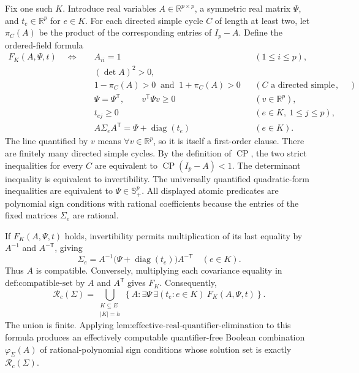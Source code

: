 Fix one such \(K\).  Introduce real variables \(A\in\mathbb R^{p\times p}\), a symmetric real matrix \(\Psi\), and \(t_e\in\mathbb R^p\) for \(e\in K\).  For each directed simple cycle \(C\) of length at least two, let \(\pi_C(A)\) be the product of the corresponding entries of \(I_p-A\).  Define the ordered-field formula
\[
\begin{aligned}
 F_K(A,\Psi,t)\quad\Longleftrightarrow\quad
 &A_{ii}=1 &&(1\leq i\leq p),\\
 &(\det A)^2>0,\\
 &1-\pi_C(A)>0\ \text{ and }\ 1+\pi_C(A)>0
   &&(C\text{ a directed simple cycle}),\\
 &\Psi=\Psi^{\mathsf T},\qquad
   v^{\mathsf T}\Psi v\geq0 &&(v\in\mathbb R^p),\\
 &t_{ej}\geq0 &&(e\in K,\ 1\leq j\leq p),\\
 &A\Sigma_eA^{\mathsf T}=\Psi+\operatorname{diag}(t_e)
   &&(e\in K).
\end{aligned}
\]
The line quantified by \(v\) means \(\forall v\in\mathbb R^p\), so it is itself a first-order clause.  There are finitely many directed simple cycles.  By the definition of \(\operatorname{CP}\), the two strict inequalities for every \(C\) are equivalent to \(\operatorname{CP}(I_p-A)<1\).  The determinant inequality is equivalent to invertibility.  The universally quantified quadratic-form inequalities are equivalent to \(\Psi\in\mathbb S_+^p\).  All displayed atomic predicates are polynomial sign conditions with rational coefficients because the entries of the fixed matrices \(\Sigma_e\) are rational.

If \(F_K(A,\Psi,t)\) holds, invertibility permits multiplication of its last equality by \(A^{-1}\) and \(A^{-\mathsf T}\), giving
\[
 \Sigma_e=A^{-1}\bigl(\Psi+\operatorname{diag}(t_e)\bigr)A^{-\mathsf T}
 \quad(e\in K).
\]
Thus \(A\) is compatible.  Conversely, multiplying each covariance equality in \(\text{def:compatible-set}\) by \(A\) and \(A^{\mathsf T}\) gives \(F_K\).  Consequently,
\[
 \mathcal R_c(\Sigma)
 =\bigcup_{\substack{K\subseteq E\\ |K|=h}}
   \left\{A:\exists\Psi\,\exists(t_e:e\in K)\ F_K(A,\Psi,t)\right\}.
\]
The union is finite.  Applying \(\text{lem:effective-real-quantifier-elimination}\) to this formula produces an effectively computable quantifier-free Boolean combination \(\varphi_\Sigma(A)\) of rational-polynomial sign conditions whose solution set is exactly \(\mathcal R_c(\Sigma)\).

